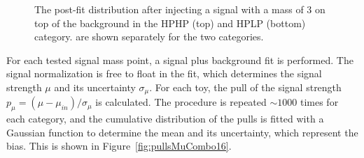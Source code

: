 \begin{figure}[h!]
\caption{The post-fit distribution after injecting a signal with a mass of 3 \TeV on top of the background in the HPHP (top) and HPLP (bottom) category. are shown separately for the two categories.}
\label{fig:signalToy}
\end{figure}
For each tested signal mass point, a signal plus background fit is performed. The signal normalization is free to float in the fit, which determines the signal strength $\mu$ and its uncertainty $\sigma_\mu$. For each toy, the pull of the signal strength $p_\mu = (\mu-\mu_{in})/\sigma_\mu$ is calculated. The procedure is repeated $\sim 1000$ times for each category, and the cumulative distribution of the pulls is fitted with a Gaussian function to determine the mean and its uncertainty, which represent the bias. This is shown in Figure~\ref{fig:pullsMuCombo16}.
